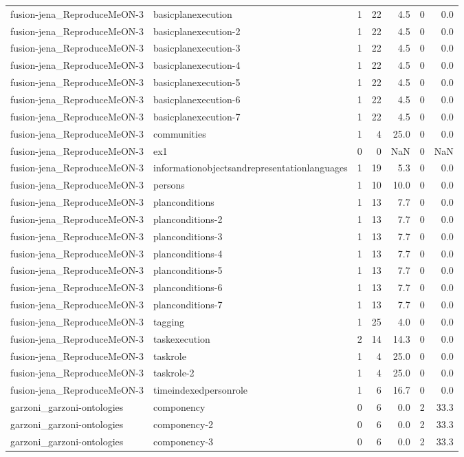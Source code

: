 \begin{tabular}{llrrrrr}
fusion-jena_ReproduceMeON-3 & basicplanexecution & 1 & 22 & 4.5 & 0 & 0.0 \\
fusion-jena_ReproduceMeON-3 & basicplanexecution-2 & 1 & 22 & 4.5 & 0 & 0.0 \\
fusion-jena_ReproduceMeON-3 & basicplanexecution-3 & 1 & 22 & 4.5 & 0 & 0.0 \\
fusion-jena_ReproduceMeON-3 & basicplanexecution-4 & 1 & 22 & 4.5 & 0 & 0.0 \\
fusion-jena_ReproduceMeON-3 & basicplanexecution-5 & 1 & 22 & 4.5 & 0 & 0.0 \\
fusion-jena_ReproduceMeON-3 & basicplanexecution-6 & 1 & 22 & 4.5 & 0 & 0.0 \\
fusion-jena_ReproduceMeON-3 & basicplanexecution-7 & 1 & 22 & 4.5 & 0 & 0.0 \\
fusion-jena_ReproduceMeON-3 & communities & 1 & 4 & 25.0 & 0 & 0.0 \\
fusion-jena_ReproduceMeON-3 & ex1 & 0 & 0 & NaN & 0 & NaN \\
fusion-jena_ReproduceMeON-3 & informationobjectsandrepresentationlanguages & 1 & 19 & 5.3 & 0 & 0.0 \\
fusion-jena_ReproduceMeON-3 & persons & 1 & 10 & 10.0 & 0 & 0.0 \\
fusion-jena_ReproduceMeON-3 & planconditions & 1 & 13 & 7.7 & 0 & 0.0 \\
fusion-jena_ReproduceMeON-3 & planconditions-2 & 1 & 13 & 7.7 & 0 & 0.0 \\
fusion-jena_ReproduceMeON-3 & planconditions-3 & 1 & 13 & 7.7 & 0 & 0.0 \\
fusion-jena_ReproduceMeON-3 & planconditions-4 & 1 & 13 & 7.7 & 0 & 0.0 \\
fusion-jena_ReproduceMeON-3 & planconditions-5 & 1 & 13 & 7.7 & 0 & 0.0 \\
fusion-jena_ReproduceMeON-3 & planconditions-6 & 1 & 13 & 7.7 & 0 & 0.0 \\
fusion-jena_ReproduceMeON-3 & planconditions-7 & 1 & 13 & 7.7 & 0 & 0.0 \\
fusion-jena_ReproduceMeON-3 & tagging & 1 & 25 & 4.0 & 0 & 0.0 \\
fusion-jena_ReproduceMeON-3 & taskexecution & 2 & 14 & 14.3 & 0 & 0.0 \\
fusion-jena_ReproduceMeON-3 & taskrole & 1 & 4 & 25.0 & 0 & 0.0 \\
fusion-jena_ReproduceMeON-3 & taskrole-2 & 1 & 4 & 25.0 & 0 & 0.0 \\
fusion-jena_ReproduceMeON-3 & timeindexedpersonrole & 1 & 6 & 16.7 & 0 & 0.0 \\
garzoni_garzoni-ontologies & componency & 0 & 6 & 0.0 & 2 & 33.3 \\
garzoni_garzoni-ontologies & componency-2 & 0 & 6 & 0.0 & 2 & 33.3 \\
garzoni_garzoni-ontologies & componency-3 & 0 & 6 & 0.0 & 2 & 33.3 \\
\bottomrule
\end{tabular}
